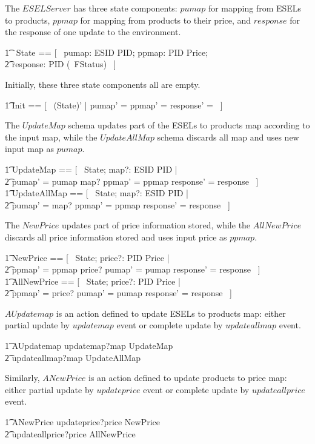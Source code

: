 The $ESELServer$ has three state components: $pumap$ for mapping from ESELs to products, $ppmap$ for mapping from products to their price, and $response$ for the response of one update to the environment.
\begin{circusaction}
    	\t1 \circstate\ State == [~ pumap: ESID \pfun PID; ppmap: PID \pfun Price; \\
            \t2 response: PID \pfun (\power~FStatus) ~]
\end{circusaction}
Initially, these three state components all are empty.
\begin{zed}
    	\t1	Init == [~ (State)' | pumap' = \emptyset \land ppmap' = \emptyset \land response' = \emptyset ~]
\end{zed}
The $UpdateMap$ schema updates part of the ESELs to products map according to the input map, while the $UpdateAllMap$ schema discards all map and uses new input map as $pumap$. 
\begin{zed}
        \t1 UpdateMap == [~ \Delta State; map?: ESID \pfun PID | \\
            \t2 pumap' = pumap \oplus map? \land ppmap' = ppmap \land response' = response ~] \\
        \t1 UpdateAllMap == [~ \Delta State; map?: ESID \pfun PID | \\
            \t2 pumap' = map? \land ppmap' = ppmap \land response' = response ~] 
\end{zed}
The $NewPrice$ updates part of price information stored, while the $AllNewPrice$ discards all price information stored and uses input price as $ppmap$. 
\begin{zed}
        \t1 NewPrice == [~ \Delta State; price?: PID \pfun Price | \\
            \t2 ppmap' = ppmap \oplus price? \land pumap' = pumap \land response' = response ~] \\
        \t1 AllNewPrice == [~ \Delta State; price?: PID \pfun Price | \\
            \t2 ppmap' = price? \land pumap' = pumap \land response' = response ~]
\end{zed}
$AUpdatemap$ is an action defined to update ESELs to products map: either partial update by $updatemap$ event or complete update by $updateallmap$ event.
\begin{circusaction}
        \t1 AUpdatemap \circdef updatemap?map \then \lschexpract UpdateMap \rschexpract \\
            \t2 \extchoice updateallmap?map \then \lschexpract UpdateAllMap \rschexpract \\
\end{circusaction}
Similarly, $ANewPrice$ is an action defined to update products to price map: either partial update by $updateprice$ event or complete update by $updateallprice$ event.
\begin{circusaction}
        \t1 ANewPrice \circdef updateprice?price \then \lschexpract NewPrice \rschexpract \\
            \t2 \extchoice updateallprice?price \then \lschexpract AllNewPrice \rschexpract \\
\end{circusaction}

